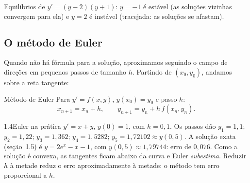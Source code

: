 {}{Equilíbrios de $y'=(y-2)(y+1)$: $y=-1$ é estável (as soluções
vizinhas convergem para ela) e $y=2$ é instável (tracejada: as soluções se afastam).}

\subsection{O método de Euler}

Quando não há fórmula para a solução, aproximamos seguindo o campo de direções em pequenos
passos de tamanho $h$. Partindo de $(x_0,y_0)$, andamos sobre a reta tangente:

\begin{regra}{Método de Euler}
Para $y'=f(x,y)$, $y(x_0)=y_0$ e passo $h$:
\[
x_{n+1}=x_n+h,\qquad y_{n+1}=y_n+h\,f(x_n,y_n).
\]
\end{regra}

\begin{exemplo}{1.4}{Euler na prática}
$y'=x+y$, $y(0)=1$, com $h=0{,}1$. Os passos dão $y_1=1{,}1$; $y_2=1{,}22$; $y_3=1{,}362$;
$y_4=1{,}5282$; $y_5=1{,}72102\approx y(0{,}5)$. A solução exata (seção~1.5) é
$y=2e^x-x-1$, com $y(0{,}5)\approx1{,}79744$: erro de $0{,}076$. Como a solução é convexa, as
tangentes ficam abaixo da curva e Euler \emph{subestima}. Reduzir $h$ à metade reduz o erro
aproximadamente à metade: o método tem erro proporcional a $h$.
\end{exemplo}

